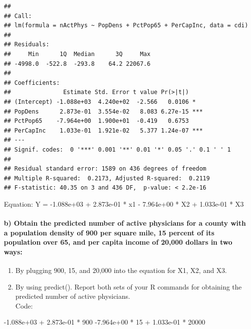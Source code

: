 \documentclass[
]{article}
\newenvironment{Shaded}{\begin{snugshade}}{\end{snugshade}}
\newcommand{\DecValTok}[1]{\textcolor[rgb]{0.00,0.00,0.81}{#1}}
\newcommand{\FloatTok}[1]{\textcolor[rgb]{0.00,0.00,0.81}{#1}}
\newcommand{\SpecialCharTok}[1]{\textcolor[rgb]{0.00,0.00,0.00}{#1}}
\providecommand{\tightlist}{%
  \setlength{\itemsep}{0pt}\setlength{\parskip}{0pt}}
\begin{document}
\begin{verbatim}
## 
## Call:
## lm(formula = nActPhys ~ PopDens + PctPop65 + PerCapInc, data = cdi)
## 
## Residuals:
##     Min      1Q  Median      3Q     Max 
## -4998.0  -522.8  -293.8    64.2 22067.6 
## 
## Coefficients:
##               Estimate Std. Error t value Pr(>|t|)    
## (Intercept) -1.088e+03  4.240e+02  -2.566   0.0106 *  
## PopDens      2.873e-01  3.554e-02   8.083 6.27e-15 ***
## PctPop65    -7.964e+00  1.900e+01  -0.419   0.6753    
## PerCapInc    1.033e-01  1.921e-02   5.377 1.24e-07 ***
## ---
## Signif. codes:  0 '***' 0.001 '**' 0.01 '*' 0.05 '.' 0.1 ' ' 1
## 
## Residual standard error: 1589 on 436 degrees of freedom
## Multiple R-squared:  0.2173, Adjusted R-squared:  0.2119 
## F-statistic: 40.35 on 3 and 436 DF,  p-value: < 2.2e-16
\end{verbatim}

Equation: Y = -1.088e+03 + 2.873e-01 * x1 - 7.964e+00 * X2 + 1.033e-01 *
X3

\hypertarget{b-obtain-the-predicted-number-of-active-physicians-for-a-county-with-a-population-density-of-900-per-square-mile-15-percent-of-its-population-over-65-and-per-capita-income-of-20000-dollars-in-two-ways}{%
\paragraph{b) Obtain the predicted number of active physicians for a
county with a population density of 900 per square mile, 15 percent of
its population over 65, and per capita income of 20,000 dollars in two
ways:}\label{b-obtain-the-predicted-number-of-active-physicians-for-a-county-with-a-population-density-of-900-per-square-mile-15-percent-of-its-population-over-65-and-per-capita-income-of-20000-dollars-in-two-ways}}

\begin{enumerate}
\def\labelenumi{\arabic{enumi}.}
\tightlist
\item
  By plugging 900, 15, and 20,000 into the equation for X1, X2, and X3.
\item
  By using predict(). Report both sets of your R commands for obtaining
  the predicted number of active physicians.\\
  Code:
\end{enumerate}

\begin{Shaded}
\begin{Highlighting}[]
\SpecialCharTok{{-}}\FloatTok{1.088e+03} \SpecialCharTok{+} \FloatTok{2.873e{-}01} \SpecialCharTok{*} \DecValTok{900} \SpecialCharTok{{-}}\FloatTok{7.964e+00} \SpecialCharTok{*} \DecValTok{15} \SpecialCharTok{+} \FloatTok{1.033e{-}01} \SpecialCharTok{*} \DecValTok{20000}
\end{Highlighting}
\end{Shaded}
\end{document}
